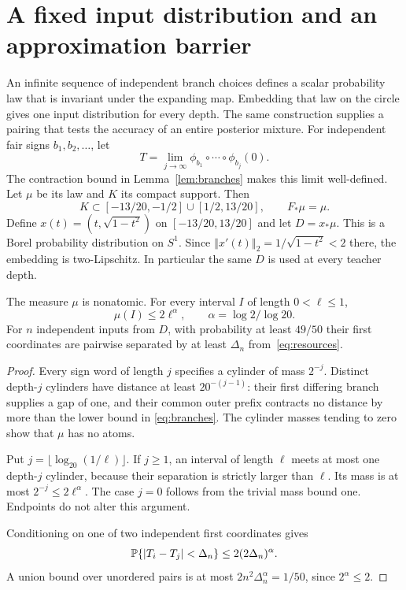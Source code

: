 \documentclass[11pt]{article}
\theoremstyle{remark}\newtheorem{remark}[theorem]{Remark}
\newcommand{\norm}[1]{\left\Vert#1\right\Vert}
\begin{document}
\section{A fixed input distribution and an approximation barrier}
\label{sec:distribution}
An infinite sequence of independent branch choices defines a scalar
probability law that is invariant under the expanding map. Embedding
that law on the circle gives one input distribution for every depth.
The same construction supplies a pairing that tests the accuracy of an
entire posterior mixture.
For independent fair signs $b_1,b_2,\ldots$, let
\[
 T=\lim_{j\to\infty}\phi_{b_1}\circ\cdots\circ\phi_{b_j}(0).
\]
The contraction bound in Lemma~\ref{lem:branches} makes this limit
well-defined. Let $\mu$ be its law and $K$ its compact support. Then
\[
 K\subset[-13/20,-1/2]\cup[1/2,13/20],\qquad F_*\mu=\mu.
\]
Define $x(t)=(t,\sqrt{1-t^2})$ on $[-13/20,13/20]$ and let
$D=x_*\mu$. This is a Borel probability distribution on $S^1$.
Since $\norm{x'(t)}_2=1/\sqrt{1-t^2}<2$ there, the embedding is
two-Lipschitz. In particular the same $D$ is used at every teacher depth.

\begin{lemma}\label{lem:separation}
The measure $\mu$ is nonatomic. For every interval $I$ of length
$0<\ell\le1$,
\begin{equation}\label{eq:frostman}
 \mu(I)\le2\ell^\alpha,\qquad \alpha=\log2/\log20.
\end{equation}
For $n$ independent inputs from $D$, with probability at least $49/50$
their first coordinates are pairwise separated by at least $\Delta_n$
from~\eqref{eq:resources}.
\end{lemma}
\begin{proof}
Every sign word of length $j$ specifies a cylinder of mass $2^{-j}$.
Distinct depth-$j$ cylinders have distance at least $20^{-(j-1)}$:
their first differing branch supplies a gap of one, and their common
outer prefix contracts no distance by more than the lower bound in
\eqref{eq:branches}. The cylinder masses tending to zero show that
$\mu$ has no atoms.

Put $j=\lfloor\log_{20}(1/\ell)\rfloor$. If $j\ge1$, an interval
of length $\ell$ meets at most one depth-$j$ cylinder, because their
separation is strictly larger than $\ell$. Its mass is at most
$2^{-j}\le2\ell^\alpha$. The case $j=0$ follows from the trivial
mass bound one. Endpoints do not alter this argument.

Conditioning on one of two independent first coordinates gives
\[
 \mathbb P\{|T_i-T_j|<\Delta_n\}
 \le2(2\Delta_n)^\alpha.
\]
A union bound over unordered pairs is at most
$2n^2\Delta_n^\alpha=1/50$, since $2^\alpha\le2$.
\end{proof}
\end{document}

